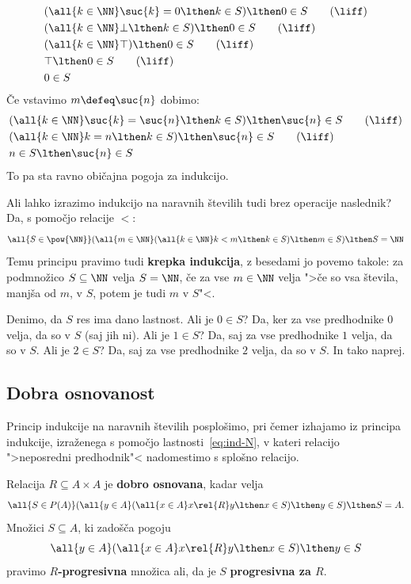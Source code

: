 %
\begin{align}
  &(\all{k \in \NN} \suc{k} = 0 \lthen k \in S) \lthen 0 \in S \tag{$\liff$} \\
  &(\all{k \in \NN} \bot \lthen k \in S) \lthen 0 \in S \tag{$\liff$} \\
  &(\all{k \in \NN} \top) \lthen 0 \in S \tag{$\liff$} \\
  &\top \lthen 0 \in S \tag{$\liff$} \\
  &0 \in S \notag
\end{align}
%
Če vstavimo $m \defeq \suc{n}$ dobimo:
%
\begin{align}
  &(\all{k \in \NN} \suc{k} = \suc{n} \lthen k \in S) \lthen \suc{n} \in S \tag{$\liff$} \\
  &(\all{k \in \NN} k = n \lthen k \in S) \lthen \suc{n} \in S \tag{$\liff$} \\
  &n \in S \lthen \suc{n} \in S \notag
\end{align}
%
To pa sta ravno običajna pogoja za indukcijo.

Ali lahko izrazimo indukcijo na naravnih številih tudi brez operacije naslednik?
Da, s pomočjo relacije $<$:
%
\begin{equation*}
    \all{S \in \pow{\NN}} (\all{m \in \NN} (\all{k \in \NN} k < m \lthen k \in S) \lthen m \in S) \lthen S = \NN
\end{equation*}
%
Temu principu pravimo tudi \textbf{krepka indukcija}, z besedami jo povemo takole: za podmnožico $S \subseteq \NN$ velja
$S = \NN$, če za vse $m \in \NN$ velja ">če so vsa števila, manjša od $m$, v $S$, potem je tudi $m$ v $S$"<.

Denimo, da $S$ res ima dano lastnost. Ali je $0 \in S$? Da, ker za vse predhodnike $0$ velja, da
so v $S$ (saj jih ni). Ali je $1 \in S$? Da, saj za vse predhodnike $1$ velja, da so v $S$. Ali je $2 \in
S$? Da, saj za vse predhodnike $2$ velja, da so v $S$. In tako naprej.


\subsection{Dobra osnovanost}

Princip indukcije na naravnih številih posplošimo, pri čemer izhajamo iz principa indukcije, izraženega s pomočjo lastnosti~\eqref{eq:ind-N}, v kateri relacijo ">neposredni predhodnik"< nadomestimo s splošno relacijo.

\begin{definicija}
  Relacija $R \subseteq A \times A$ je \textbf{dobro osnovana}, kadar velja
  \begin{equation}
    \label{eq:ind-wf}%
    \all{S \in P(A)} (\all{y \in A} (\all{x \in A} x \rel{R} y \lthen x \in S) \lthen y \in S) \lthen S = A.
  \end{equation}
  Množici $S \subseteq A$, ki zadošča pogoju
  \begin{equation*}
  \all{y \in A} (\all{x \in A} x \rel{R} y \lthen x \in S) \lthen y \in S
  \end{equation*}
  pravimo \textbf{$R$-progresivna} množica ali, da je $S$ \textbf{progresivna za $R$}.
\end{definicija}

